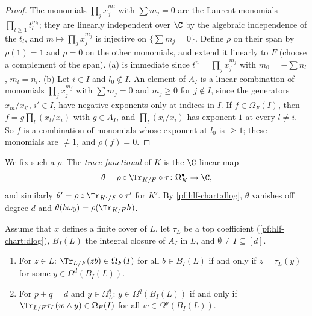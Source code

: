 \begin{proof}
The monomials $\prod_jx_j^{m_j}$ with $\sum m_j=0$ are the Laurent monomials $\prod_{l\ge1}t_l^{m_l}$; they are linearly independent over $\C$
by the algebraic independence of the $t_l$, and $m\mapsto\prod_jx_j^{m_j}$ is injective on $\{\sum m_j=0\}$. Define $\rho$ on their span by
$\rho(1)=1$ and $\rho=0$ on the other monomials, and extend it linearly to $F$ (choose a complement of the span). (a) is immediate since
$t^n=\prod_jx_j^{m_j}$ with $m_0=-\sum n_l$, $m_l=n_l$. (b) Let $i\in I$ and $l_0\notin I$. An element of $A_I$ is a linear combination of
monomials $\prod_jx_j^{m_j}$ with $\sum m_j=0$ and $m_j\ge0$ for $j\notin I$, since the generators $x_m/x_{i'}$, $i'\in I$, have negative
exponents only at indices in $I$. If $f\in\Omega_F(I)$, then $f=g\prod_l(x_l/x_i)$ with $g\in A_I$, and $\prod_l(x_l/x_i)$ has exponent $1$ at
every $l\ne i$. So $f$ is a combination of monomials whose exponent at $l_0$ is $\ge1$; these monomials are $\ne1$, and $\rho(f)=0$.
\end{proof}

We fix such a $\rho$. The \emph{trace functional} of $K$ is the $\C$-linear map
\[
  \theta=\rho\circ\Tr_{K/F}\circ\tau\colon\Omega^\bullet_K\to\C,
\]
and similarly $\theta'=\rho\circ\Tr_{K'/F}\circ\tau'$ for $K'$. By \cref{pf:hlf-chart:dlog}, $\theta$ vanishes off degree $d$ and $\theta(h\omega_0)=\rho(\Tr_{K/F}h)$.

\begin{littheorem}\label{pf:hlf-chart:dual}
Assume that $x$ defines a finite cover of $L$, let $\tau_L$ be a top coefficient (\cref{pf:hlf-chart:dlog}), $B_I(L)$ the integral closure of
$A_I$ in $L$, and $\emptyset\ne I\subseteq[d]$.
\begin{enumerate}[label=\textup{(\alph*)},nosep]
\item For $z\in L$: $\Tr_{L/F}(zb)\in\Omega_F(I)$ for all $b\in B_I(L)$ if and only if $z=\tau_L(y)$ for some $y\in\Omega^d(B_I(L))$.
\item For $p+q=d$ and $y\in\Omega^q_L$: $y\in\Omega^q(B_I(L))$ if and only if $\Tr_{L/F}\tau_L(w\wedge y)\in\Omega_F(I)$ for all $w\in\Omega^p(B_I(L))$.
\end{enumerate}
\end{littheorem}

